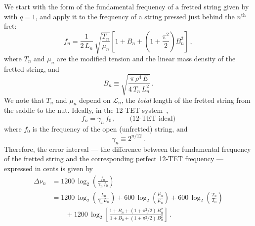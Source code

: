 We start with the form of the fundamental frequency of a fretted string given by  with $q = 1$, and apply it to the frequency of a string pressed just behind the $n^\mathrm{th}$ fret:
 \begin{equation} \label{eqn:f_n_def}
f_n = \frac{1}{2\, L_n}\, \sqrt{\frac{T_n}{\mu_n}} \left[ 1 + B_n + \left(1 + \frac{\pi^2}{2}\right) B_n^2 \right]\, ,
 \end{equation}
where $T_n$ and $\mu_n$ are the modified tension and the linear mass density of the fretted string, and
 \begin{equation} \label{eqn:b_n_def}
B_n \equiv \sqrt{\frac{\pi\, \rho^4\, E}{4\, T_n\, L_n^2}}\, .
 \end{equation}
We note that $T_n$ and $\mu_n$ depend on $\mathcal{L}_n$, the \emph{total} length of the fretted string from the saddle to the nut. Ideally, in the 12-TET system~\cite{ref:durfee2015pms},
 \begin{equation} \label{eqn:f_n_tet}
f_n = \gamma_n\, f_0\, , \qquad \textrm{(12-TET~ideal)}
 \end{equation}
where $f_0$ is the frequency of the open (unfretted) string, and
 \begin{equation} \label{eqn:gamme_n_def}
\gamma_n \equiv 2^{n / 12}\, .
 \end{equation}
Therefore, the error interval --- the difference between the fundamental frequency of the fretted string and the corresponding perfect 12-TET frequency --- expressed in cents is given by
 \begin{equation}\label{eqn:error_def}
 \begin{split}
\Delta \nu_n &= 1200\, \log_2\left( \frac{f_n}{\gamma_n\, f_0} \right) \\
&= 1200\, \log_2 \left( \frac{L_0}{\gamma_n\, L_n} \right) + 600\, \log_2 \left(  \frac{\mu_0}{\mu_n} \right) + 600\, \log_2 \left( \frac{T_n}{T_0} \right) \\
&\qquad + 1200\, \log_2 \left[ \frac{1 + B_n + (1 + \pi^2/2)\, B_n^2}{1 + B_0 + (1 + \pi^2/2)\, B_0^2} \right]\, .
 \end{split}
 \end{equation}

